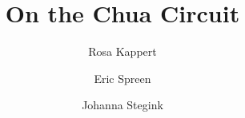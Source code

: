 \documentclass[twocolumn,10pt]{article}
\title{On the Chua Circuit}
\author{Rosa Kappert \and Eric Spreen \and Johanna Stegink}
\begin{document}
\maketitle





\onecolumn
\appendix
\end{document}
